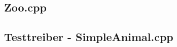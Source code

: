 \documentclass[12pt,naustrian,a4widepaper]{scrartcl}
\begin{document}
\subsection{Zoo.cpp}


\subsection{Testtreiber - SimpleAnimal.cpp}


%


\end{document}
